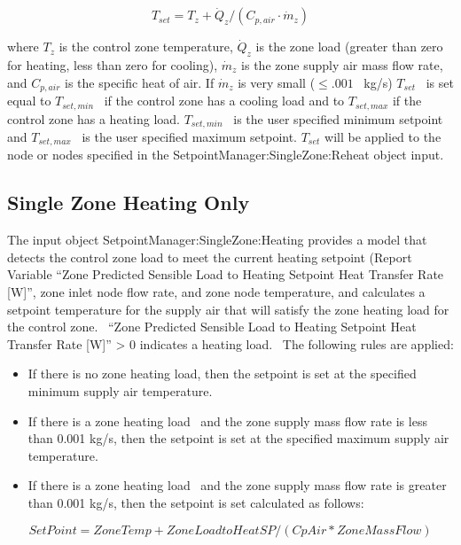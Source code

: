 \begin{equation}
{T_{set}} = {T_z} + {\dot Q_z}/({C_{p,air}}\cdot {\dot m_z})
\end{equation}

where \({T_z}\) is the control zone temperature, \({\dot Q_z}\) is the zone load (greater than zero for heating, less than zero for cooling), \({\dot m_z}\) is the zone supply air mass flow rate, and \({C_{p,air}}\) is the specific heat of air. If \({\dot m_z}\) is very small (\(\le .001\) ~kg/s) \({T_{set}}\) ~is set equal to \({T_{set,min}}\) ~if the control zone has a cooling load and to \({T_{set,max}}\) if the control zone has a heating load. \({T_{set,min}}\) ~is the user specified minimum setpoint and \({T_{set,max}}\) ~is the user specified maximum setpoint. \({T_{set}}\) will be applied to the node or nodes specified in the SetpointManager:SingleZone:Reheat object input.

\subsection{Single Zone Heating Only}\label{single-zone-heating-only}

The input object SetpointManager:SingleZone:Heating provides a model that detects the control zone load to meet the current heating setpoint (Report Variable ``Zone Predicted Sensible Load to Heating Setpoint Heat Transfer Rate {[}W{]}'', zone inlet node flow rate, and zone node temperature, and calculates a setpoint temperature for the supply air that will satisfy the zone heating load for the control zone.~ ``Zone Predicted Sensible Load to Heating Setpoint Heat Transfer Rate {[}W{]}'' \textgreater{} 0 indicates a heating load.~ The following rules are applied:

\begin{itemize}
\item If there is no zone heating load, then the setpoint is set at the specified minimum supply air temperature.
\item If there is a zone heating load~ and the zone supply mass flow rate is less than 0.001 kg/s, then the setpoint is set at the specified maximum supply air temperature.
\item If there is a zone heating load~ and the zone supply mass flow rate is greater than 0.001 kg/s, then the setpoint is set calculated as follows:
\end{itemize}

\begin{equation}
SetPoint = ZoneTemp + ZoneLoadtoHeatSP/(CpAir*ZoneMassFlow)
\end{equation}

